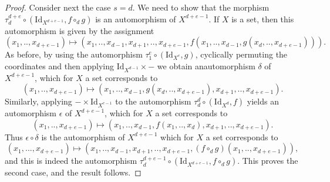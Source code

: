 \documentclass[10pt,a4paper]{amsart}
\def\Id{\mathrm{Id}}             \def\tenA{\otimes_A}
\begin{document}
\begin{proof}
\medskip
Consider next the case $s=d$. We need to show that the morphism
$\tau^{d+e}_d\circ (\Id_{X^{d+e-1}}, f\circ_d g)$ is an automorphism of $X^{d+e-1}$.
If $X$ is a set, then this automorphism is given by the assignment
$$(x_1,..,x_{d+e-1}) \mapsto   
(x_1,..,x_{d-1},x_{d+1},..,x_{d+e-1}, f(x_1,..,x_{d-1},g(x_d,..,x_{d+e-1}))).$$
As before, by using the automorphism $\tau^e_1\circ (\Id_{X^e}, g)$,
cyclically permuting the  coordinates and then applying $\Id_{X^{d-1}}\times-$
 we obtain anautomorphism $\delta$ of $X^{d+e-1}$, which for $X$ a set
 corresponds to
 $$(x_1,..,x_{d+e-1}) \mapsto (x_1,..,x_{d-1}, g(x_d,..,x_{d+e-1}), x_{d+1},..,x_{d+e-1}).$$
 Similarly, applying $-\times \Id_{X^{e-1}}$ to the automorphism 
 $\tau^d_d\circ (\Id_{X^d}, f)$ yields an automorphism $\epsilon$ of $X^{d+e-1}$,
 which for $X$ a set corresponds to
 $$(x_1,..,x_{d+e-1}) \mapsto (x_1,..,x_{d-1}, f(x_1,..,x_d), x_{d+1},..,x_{d+e-1}).$$
 Thus $\epsilon\circ\delta$ is the automorphism of $X^{d+e-1}$ which for $X$ a set
 corresponds to 
 $$(x_1,...,x_{d+e-1}) \mapsto (x_1,..,x_{d-1},x_{d+1},..,x_{d+e-1}, (f\circ_d g)(x_1,..,x_{d+e-1})),$$
 and this is indeed the automorphism $\tau^{d+e-1}_d\circ (\Id_{X^{d+e-1}}, f\circ_d g)$.
 This proves the second case, and the result follows.
\end{proof}
\end{document}
